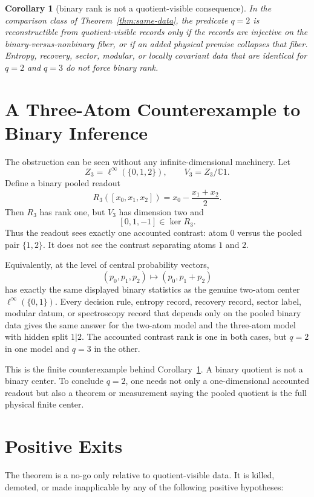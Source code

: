 \documentclass[12pt]{article}
\newtheorem{corollary}{Corollary}
\theoremstyle{definition}
\theoremstyle{remark}
\newcommand{\C}{\mathbb C}
\begin{document}
\begin{corollary}[binary rank is not a quotient-visible consequence]
\label{cor:binary}
In the comparison class of Theorem~\ref{thm:same-data}, the predicate \(q=2\)
is reconstructible from quotient-visible records only if the records are
injective on the binary-versus-nonbinary fiber, or if an added physical premise
collapses that fiber.  Entropy, recovery, sector, modular, or locally
covariant data that are identical for \(q=2\) and \(q=3\) do not force binary
rank.
\end{corollary}

\section{A Three-Atom Counterexample to Binary Inference}

The obstruction can be seen without any infinite-dimensional machinery.  Let
\[
  Z_3=\ell^\infty(\{0,1,2\}),\qquad
  V_3=Z_3/\C 1 .
\]
Define a binary pooled readout
\[
  R_3([x_0,x_1,x_2])=x_0-\frac{x_1+x_2}{2}.
\]
Then \(R_3\) has rank one, but \(V_3\) has dimension two and
\[
  [0,1,-1]\in \ker R_3 .
\]
Thus the readout sees exactly one accounted contrast: atom \(0\) versus the
pooled pair \(\{1,2\}\).  It does not see the contrast separating atoms \(1\)
and \(2\).

Equivalently, at the level of central probability vectors,
\[
  (p_0,p_1,p_2)\longmapsto (p_0,p_1+p_2)
\]
has exactly the same displayed binary statistics as the genuine two-atom
center \(\ell^\infty(\{0,1\})\).  Every decision rule, entropy record, recovery
record, sector label, modular datum, or spectroscopy record that depends only
on the pooled binary data gives the same answer for the two-atom model and the
three-atom model with hidden split \(1|2\).  The accounted contrast rank is
one in both cases, but \(q=2\) in one model and \(q=3\) in the other.

This is the finite counterexample behind Corollary~\ref{cor:binary}.  A binary
quotient is not a binary center.  To conclude \(q=2\), one needs not only a
one-dimensional accounted readout but also a theorem or measurement saying the
pooled quotient is the full physical finite center.

\section{Positive Exits}

The theorem is a no-go only relative to quotient-visible data.  It is killed,
demoted, or made inapplicable by any of the following positive hypotheses:
\end{document}
